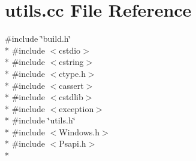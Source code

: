 \section{utils.\-cc File Reference}
\label{utils_8cc}
{\ttfamily \#include \char`\"{}build.\-h\char`\"{}}\\*
{\ttfamily \#include $<$cstdio$>$}\\*
{\ttfamily \#include $<$cstring$>$}\\*
{\ttfamily \#include $<$ctype.\-h$>$}\\*
{\ttfamily \#include $<$cassert$>$}\\*
{\ttfamily \#include $<$cstdlib$>$}\\*
{\ttfamily \#include $<$exception$>$}\\*
{\ttfamily \#include \char`\"{}utils.\-h\char`\"{}}\\*
{\ttfamily \#include $<$Windows.\-h$>$}\\*
{\ttfamily \#include $<$Psapi.\-h$>$}\\*
